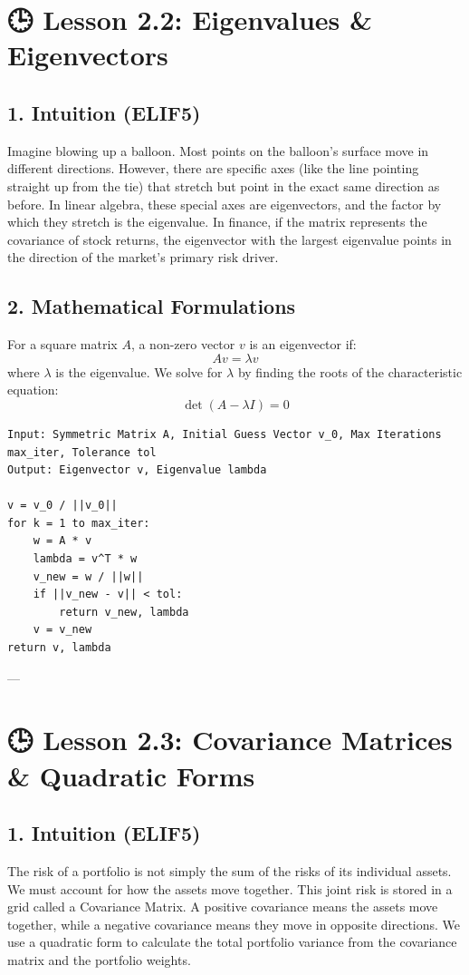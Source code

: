 \documentclass[11pt,oneside]{book}
\begin{document}
\section{🕒 Lesson 2.2: Eigenvalues \& Eigenvectors}

\subsection{1. Intuition (ELIF5)}
Imagine blowing up a balloon. Most points on the balloon's surface move in different directions. However, there are specific axes (like the line pointing straight up from the tie) that stretch but point in the exact same direction as before. In linear algebra, these special axes are eigenvectors, and the factor by which they stretch is the eigenvalue. In finance, if the matrix represents the covariance of stock returns, the eigenvector with the largest eigenvalue points in the direction of the market's primary risk driver.

\subsection{2. Mathematical Formulations}
For a square matrix $A$, a non-zero vector $v$ is an eigenvector if:
$$A v = \lambda v$$
where $\lambda$ is the eigenvalue. We solve for $\lambda$ by finding the roots of the characteristic equation:
$$\det(A - \lambda I) = 0$$

\begin{tcolorbox}[colback=white,colframe=black,boxrule=0.6pt,arc=0mm,title=Power Iteration for Principal Eigenvector]
\begin{verbatim}
Input: Symmetric Matrix A, Initial Guess Vector v_0, Max Iterations max_iter, Tolerance tol
Output: Eigenvector v, Eigenvalue lambda

v = v_0 / ||v_0||
for k = 1 to max_iter:
    w = A * v
    lambda = v^T * w
    v_new = w / ||w||
    if ||v_new - v|| < tol:
        return v_new, lambda
    v = v_new
return v, lambda
\end{verbatim}
\end{tcolorbox}

---

\section{🕒 Lesson 2.3: Covariance Matrices \& Quadratic Forms}

\subsection{1. Intuition (ELIF5)}
The risk of a portfolio is not simply the sum of the risks of its individual assets. We must account for how the assets move together. This joint risk is stored in a grid called a Covariance Matrix. A positive covariance means the assets move together, while a negative covariance means they move in opposite directions. We use a quadratic form to calculate the total portfolio variance from the covariance matrix and the portfolio weights.
\end{document}
